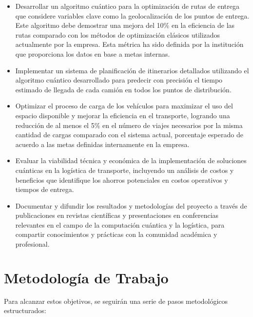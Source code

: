 \documentclass[11pt,a4paper,spanish]{book}
\begin{document}
\begin{itemize}
    \item Desarrollar un algoritmo cuántico para la optimización de rutas de entrega que considere variables clave como la geolocalización de los puntos de entrega. Este algoritmo debe demostrar una mejora del 10\% en la eficiencia de las rutas comparado con los métodos de optimización clásicos utilizados actualmente por la empresa. Esta métrica ha sido definida por la institución que proporciona los datos en base a metas internas.

    \item Implementar un sistema de planificación de itinerarios detallados utilizando el algoritmo cuántico desarrollado para predecir con precisión el tiempo estimado de llegada de cada camión en todos los puntos de distribución.

    \item Optimizar el proceso de carga de los vehículos para maximizar el uso del espacio disponible y mejorar la eficiencia en el transporte, logrando una reducción de al menos el 5\% en el número de viajes necesarios por la misma cantidad de cargas comparado con el sistema actual, porcentaje esperado de acuerdo a las metas definidas internamente en la empresa.

    \item Evaluar la viabilidad técnica y económica de la implementación de soluciones cuánticas en la logística de transporte, incluyendo un análisis de costos y beneficios que identifique los ahorros potenciales en costos operativos y tiempos de entrega.

    \item Documentar y difundir los resultados y metodologías del proyecto a través de publicaciones en revistas científicas y presentaciones en conferencias relevantes en el campo de la computación cuántica y la logística, para compartir conocimientos y prácticas con la comunidad académica y profesional.

\end{itemize}

\section{Metodología de Trabajo}

Para alcanzar estos objetivos, se seguirán una serie de pasos metodológicos estructurados:
\end{document}
